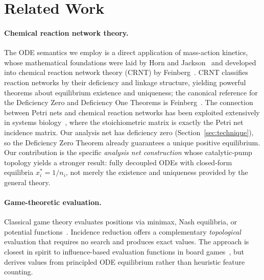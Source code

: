 \documentclass[11pt,a4paper]{article}
\begin{document}
\section{Related Work}
\label{sec:related}

\paragraph{Chemical reaction network theory.}
The ODE semantics we employ is a direct application of mass-action kinetics, whose mathematical foundations were laid by Horn and Jackson~\cite{horn1972} and developed into chemical reaction network theory (CRNT) by Feinberg~\cite{feinberg1979,feinberg2019}.
CRNT classifies reaction networks by their deficiency and linkage structure, yielding powerful theorems about equilibrium existence and uniqueness; the canonical reference for the Deficiency Zero and Deficiency One Theorems is Feinberg~\cite{feinberg1987}.
The connection between Petri nets and chemical reaction networks has been exploited extensively in systems biology~\cite{heiner2008,gilbert2006}, where the stoichiometric matrix is exactly the Petri net incidence matrix.
Our analysis net has deficiency zero (Section~\ref{sec:technique}), so the Deficiency Zero Theorem already guarantees a unique positive equilibrium.
Our contribution is the specific \emph{analysis net construction} whose catalytic-pump topology yields a stronger result: fully decoupled ODEs with closed-form equilibria $x_i^* = 1/n_i$, not merely the existence and uniqueness provided by the general theory.

\paragraph{Game-theoretic evaluation.}
Classical game theory evaluates positions via minimax, Nash equilibria, or potential functions~\cite{monderer1996}.
Incidence reduction offers a complementary \emph{topological} evaluation that requires no search and produces exact values.
The approach is closest in spirit to influence-based evaluation functions in board games~\cite{allis1994}, but derives values from principled ODE equilibrium rather than heuristic feature counting.
\end{document}
